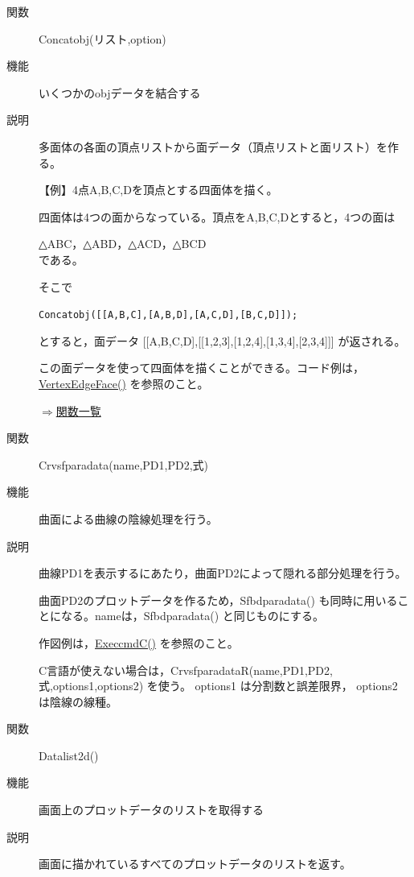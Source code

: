 \documentclass[papersize,a4paper,12pt,uplatex]{jsarticle}
\begin{document}
\begin{description}
\hypertarget{concatobj}{}    
\item[関数]  Concatobj(リスト,option)
\item[機能]  いくつかのobjデータを結合する
\item[説明]  多面体の各面の頂点リストから面データ（頂点リストと面リスト）を作る。

\vspace{\baselineskip}
【例】4点A,B,C,Dを頂点とする四面体を描く。

四面体は4つの面からなっている。頂点をA,B,C,Dとすると，4つの面は
  
              △ABC，△ABD，△ACD，△BCD\\
である。
  
        \begin{center}  \end{center}
  
そこで
  
    \verb|Concatobj([[A,B,C],[A,B,D],[A,C,D],[B,C,D]]);|
    
とすると，面データ  [[A,B,C,D],[[1,2,3],[1,2,4],[1,3,4],[2,3,4]]]   が返される。
  
この面データを使って四面体を描くことができる。コード例は，\hyperlink{vertexedgeface}{VertexEdgeFace()} を参照のこと。

\begin{flushright} \hyperlink{functionlist}{$\Rightarrow$関数一覧}\end{flushright}

\hypertarget{crvsfparadata}{}
\item[関数]  Crvsfparadata(name,PD1,PD2,式)
\item[機能]  曲面による曲線の陰線処理を行う。
\item[説明]  曲線PD1を表示するにあたり，曲面PD2によって隠れる部分処理を行う。

曲面PD2のプロットデータを作るため，Sfbdparadata() も同時に用いることになる。nameは，Sfbdparadata() と同じものにする。

作図例は，\hyperlink{execcmdc}{ExeccmdC()} を参照のこと。

C言語が使えない場合は，CrvsfparadataR(name,PD1,PD2,式,options1,options2) を使う。
options1 は分割数と誤差限界， options2 は陰線の線種。

\vspace{\baselineskip}
\hypertarget{datalist}{}    
\item[関数]  Datalist2d()
\item[機能]  画面上のプロットデータのリストを取得する
\item[説明]  画面に描かれているすべてのプロットデータのリストを返す。


\end{description}
\end{document}

